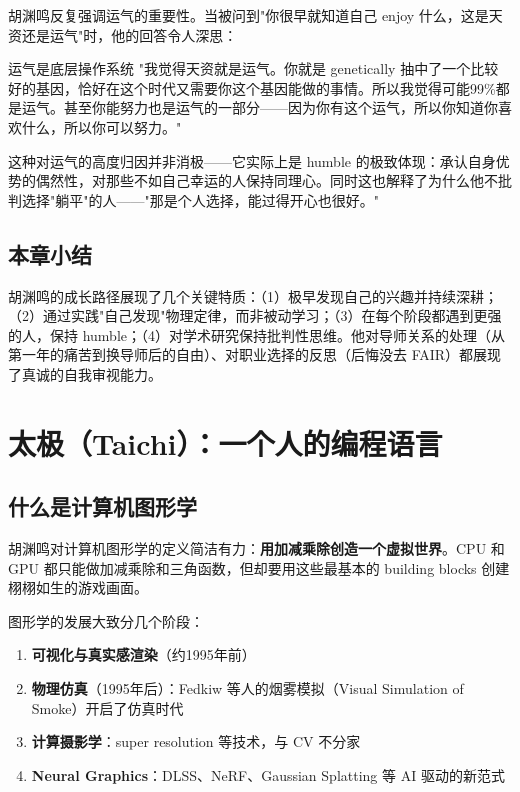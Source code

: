 \documentclass[a4paper]{article}
\begin{document}
胡渊鸣反复强调运气的重要性。当被问到"你很早就知道自己 enjoy 什么，这是天资还是运气"时，他的回答令人深思：

\begin{importantbox}{运气是底层操作系统}
"我觉得天资就是运气。你就是 genetically 抽中了一个比较好的基因，恰好在这个时代又需要你这个基因能做的事情。所以我觉得可能99\%都是运气。甚至你能努力也是运气的一部分——因为你有这个运气，所以你知道你喜欢什么，所以你可以努力。"
\end{importantbox}

这种对运气的高度归因并非消极——它实际上是 humble 的极致体现：承认自身优势的偶然性，对那些不如自己幸运的人保持同理心。同时这也解释了为什么他不批判选择"躺平"的人——"那是个人选择，能过得开心也很好。"

\subsection{本章小结}

胡渊鸣的成长路径展现了几个关键特质：（1）极早发现自己的兴趣并持续深耕；（2）通过实践"自己发现"物理定律，而非被动学习；（3）在每个阶段都遇到更强的人，保持 humble；（4）对学术研究保持批判性思维。他对导师关系的处理（从第一年的痛苦到换导师后的自由）、对职业选择的反思（后悔没去 FAIR）都展现了真诚的自我审视能力。

\section{太极（Taichi）：一个人的编程语言}

\subsection{什么是计算机图形学}

胡渊鸣对计算机图形学的定义简洁有力：\textbf{用加减乘除创造一个虚拟世界}。CPU 和 GPU 都只能做加减乘除和三角函数，但却要用这些最基本的 building blocks 创建栩栩如生的游戏画面。

图形学的发展大致分几个阶段：

\begin{enumerate}
\item \textbf{可视化与真实感渲染}（约1995年前）
\item \textbf{物理仿真}（1995年后）：Fedkiw 等人的烟雾模拟（Visual Simulation of Smoke）开启了仿真时代
\item \textbf{计算摄影学}：super resolution 等技术，与 CV 不分家
\item \textbf{Neural Graphics}：DLSS、NeRF、Gaussian Splatting 等 AI 驱动的新范式
\end{enumerate}
\end{document}
